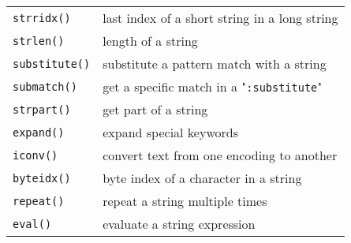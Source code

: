 \begin{center}
\begin{tabular}{l l}
				\texttt{strridx()} & last index of a short string in a long string \\
				\texttt{strlen()} & length of a string \\
				\texttt{substitute()} & substitute a pattern match with a string \\
				\texttt{submatch()} & get a specific match in a "\texttt{:substitute}" \\
				\texttt{strpart()} & get part of a string \\
				\texttt{expand()} & expand special keywords \\
				\texttt{iconv()} & convert text from one encoding to another \\
				\texttt{byteidx()} & byte index of a character in a string \\
				\texttt{repeat()} & repeat a string multiple times \\
				\texttt{eval()} & evaluate a string expression \\
\end{tabular} \end{center}

